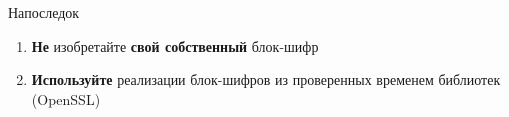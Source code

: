 \documentclass[usenames,dvipsnames,8pt,aspectratio=169]{beamer}
\begin{document}
\begin{frame}{Напоследок}
\Huge

\begin{enumerate}
	\itemsep 1em
	\item {\color{Orange}\textbf{Не}} изобретайте {\color{Orange}\textbf{свой собственный}}  блок-шифр
	\item {\color{Orange}\textbf{Используйте}} реализации блок-шифров из проверенных временем библиотек (OpenSSL)

\end{enumerate}
\end{frame}


\end{document}
